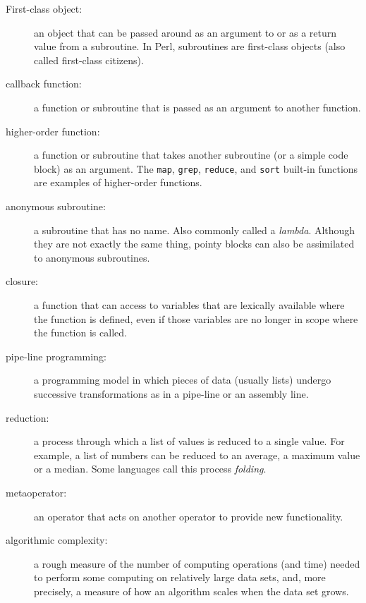 \begin{description}

\item[First-class object:] an object that can be passed around 
as an argument to or as a return value from a subroutine. 
In Perl, subroutines are first-class objects (also called 
first-class citizens). 

\item[callback function:] a function or subroutine that is 
passed as an argument to another function.

\item[higher-order function:] a function or subroutine that takes 
another subroutine (or a simple code block) as an argument. The 
{\tt map}, {\tt grep}, {\tt reduce}, and {\tt sort} built-in 
functions are examples of higher-order functions.

\item[anonymous subroutine:] a subroutine that has no name. Also 
commonly called a \emph{lambda}. Although they are not exactly 
the same thing, pointy blocks can also be assimilated to 
anonymous subroutines.

\item[closure:] a function that can access to variables that 
are lexically available where the function is defined, even 
if those variables are no longer in scope where the function 
is called.

\item[pipe-line programming:] a programming model in which 
pieces of data (usually lists) undergo successive 
transformations as in a pipe-line or an assembly line.

\item[reduction:] a process through which a list of values is 
reduced to a single value. For example, a list of numbers 
can be reduced to an average, a maximum value or a median. 
Some languages call this process \emph{folding}.

\item[metaoperator:] an operator that acts on another operator 
to provide new functionality.

\item[algorithmic complexity:] a rough measure of the number 
of computing operations (and time) needed to perform some 
computing on relatively large data sets, and, more precisely, 
a measure of how an algorithm scales when the data set grows.


\end{description}
